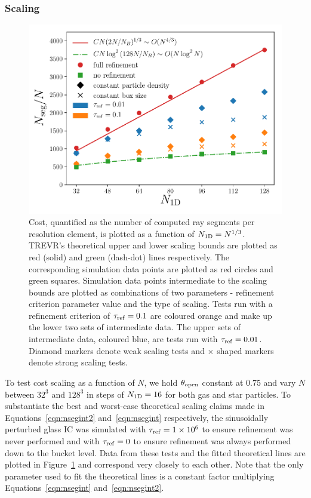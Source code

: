 \documentclass[fleq,usenatbib]{mnras}
\newcommand{\acro}{TREVR}
\providecommand{\e}[1]{\ensuremath{\times10^{#1}}}
\newcommand{\tr}{\tau_{\rm ref}}
\newcommand{\tO}{\theta_{\rm open}}
\begin{document}
{\subsubsection{Scaling}\label{scalingtest}
\begin{figure}
\includegraphics[width=1\linewidth]{Figures/particle_scaling.pdf}
\caption{Cost, quantified as the number of computed ray segments per 
resolution element, is plotted as a function of $N_{\rm 1D} = N^{1/3}$. 
\acro{}'s theoretical upper and lower scaling bounds are plotted as red 
(solid) and green (dash-dot) lines respectively. The corresponding simulation 
data points are plotted as red circles and green squares. Simulation data 
points intermediate to the scaling bounds are plotted as combinations of two 
parameters - refinement criterion parameter value and the type of scaling. Tests run 
with a refinement criterion of $\tr=0.1$ are coloured orange and make up the 
lower two sets of intermediate data. The upper sets of intermediate data, 
coloured blue, are tests run with $\tr=0.01$. Diamond markers denote weak 
scaling tests and $\times$ shaped markers denote strong scaling tests.}
\label{fig:pscale}
\end{figure}
To test cost scaling as a function of $N$, we hold $\tO$ constant at 0.75 and
vary $N$ between $32^3$ and $128^3$ in steps of $N_{\rm 1D} = 16$ for both gas 
and star particles. To substantiate the best and worst-case theoretical 
scaling claims made in Equations~\ref{eqn:nsegint2} and~\ref{eqn:nsegint} 
respectively, the sinusoidally perturbed glass IC was simulated with 
$\tr=1\e 6$ to ensure refinement was never performed and with $\tr=0$ to 
ensure refinement was always performed down to the bucket level. Data from 
these tests and the fitted theoretical lines are plotted in 
Figure~\ref{fig:pscale} and correspond very closely to each other. Note that 
the only parameter used to fit the theoretical lines is a constant factor 
multiplying Equations~\ref{eqn:nsegint} and~\ref{eqn:nsegint2}.

}
\end{document}
